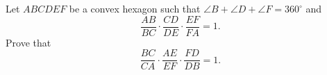 Let $ABCDEF$ be a convex hexagon such that $\angle B + \angle D + \angle F = 360^{\circ}$ and
\[ \frac{AB}{BC} \cdot \frac{CD}{DE} \cdot \frac{EF}{FA} = 1. \]
Prove that
\[ \frac{BC}{CA} \cdot \frac{AE}{EF} \cdot \frac{FD}{DB} = 1. \]
